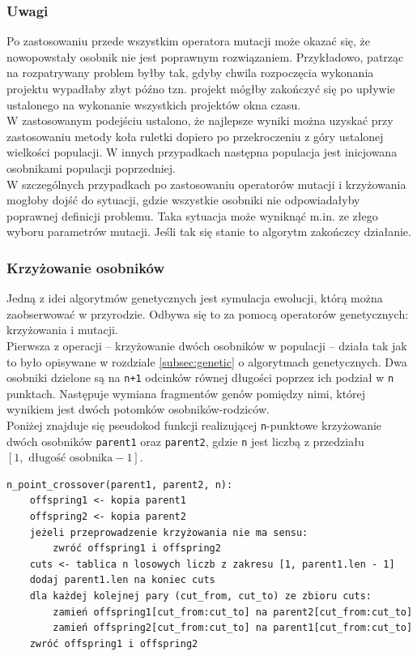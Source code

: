\documentclass[12pt,a4paper]{article}
\theoremstyle{definition}
\begin{document}
\subsubsection*{Uwagi}
Po zastosowaniu przede wszystkim operatora mutacji może okazać się, że nowopowstały osobnik nie jest poprawnym rozwiązaniem. Przykładowo, patrząc na rozpatrywany problem byłby tak, gdyby chwila rozpoczęcia wykonania projektu wypadłaby zbyt późno tzn. projekt mógłby zakończyć się po upływie ustalonego na wykonanie wszystkich projektów okna czasu. \\

\noindent 
W zastosowanym podejściu ustalono, że najlepsze wyniki można uzyskać przy zastosowaniu metody koła ruletki dopiero po przekroczeniu z góry ustalonej wielkości populacji. W innych przypadkach następna populacja jest inicjowana osobnikami populacji poprzedniej. \\

\noindent
W szczególnych przypadkach po zastosowaniu operatorów mutacji i krzyżowania mogłoby dojść do sytuacji, gdzie wszystkie osobniki nie odpowiadałyby poprawnej definicji problemu. Taka sytuacja może wyniknąć m.in. ze złego wyboru parametrów mutacji. Jeśli tak się stanie to algorytm zakończcy działanie.

\subsubsection{Krzyżowanie osobników}
Jedną z idei algorytmów genetycznych jest symulacja ewolucji, którą można zaobserwować w przyrodzie. Odbywa się to za pomocą operatorów genetycznych: krzyżowania i mutacji.\\

\noindent
Pierwsza z operacji -- krzyżowanie dwóch osobników w populacji -- działa tak jak to było opisywane w rozdziale \ref{subsec:genetic} o algorytmach genetycznych. Dwa osobniki dzielone są na \texttt{n+1} odcinków równej długości poprzez ich podział w \texttt{n} punktach. Następuje wymiana fragmentów genów pomiędzy nimi, której wynikiem jest dwóch potomków osobników-rodziców.\\

\noindent
Poniżej znajduje się pseudokod funkcji realizującej \texttt{n}-punktowe krzyżowanie dwóch osobników \texttt{parent1} oraz \texttt{parent2}, gdzie \texttt{n} jest liczbą z przedziału $[1, \text{ długość osobnika} - 1]$.\\

\begin{tcolorbox}[title=Krzyżowanie dwóch osobników]
\begin{verbatim}
n_point_crossover(parent1, parent2, n):
    offspring1 <- kopia parent1
    offspring2 <- kopia parent2
    jeżeli przeprowadzenie krzyżowania nie ma sensu:
        zwróć offspring1 i offspring2
    cuts <- tablica n losowych liczb z zakresu [1, parent1.len - 1]
    dodaj parent1.len na koniec cuts
    dla każdej kolejnej pary (cut_from, cut_to) ze zbioru cuts:
        zamień offspring1[cut_from:cut_to] na parent2[cut_from:cut_to]
        zamień offspring2[cut_from:cut_to] na parent1[cut_from:cut_to]
    zwróć offspring1 i offspring2
\end{verbatim}
\end{tcolorbox}
\end{document}
